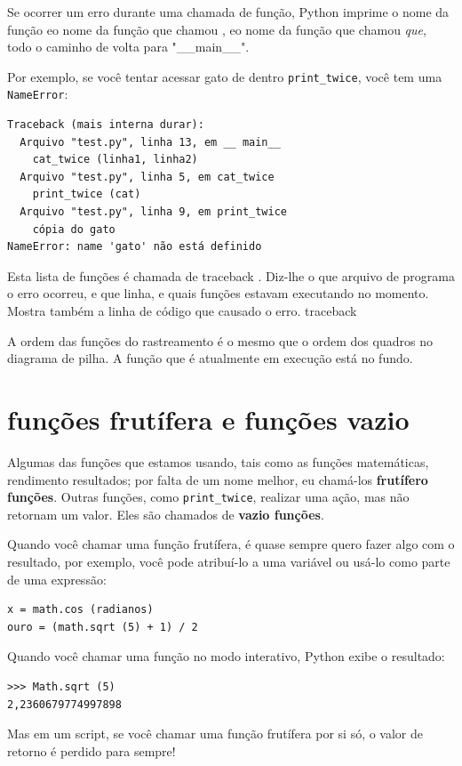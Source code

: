 \documentclass[10pt]{book}
\begin{document}
Se ocorrer um erro durante uma chamada de função, Python imprime o
nome da função eo nome da função que chamou
, eo nome da função que chamou {\em que}, todo o
caminho de volta para \verbo "__main__".

Por exemplo, se você tentar acessar {\tt} gato de dentro 
\Verb "print_twice", você tem uma {\tt NameError}:

\begin{verbatim}
Traceback (mais interna durar):
  Arquivo "test.py", linha 13, em __ main__
    cat_twice (linha1, linha2)
  Arquivo "test.py", linha 5, em cat_twice
    print_twice (cat)
  Arquivo "test.py", linha 9, em print_twice
    cópia do gato
NameError: name 'gato' não está definido
\end{verbatim}
%
Esta lista de funções é chamada de traceback {\bf}. Diz-lhe o que
arquivo de programa o erro ocorreu, e que linha, e quais funções
estavam executando no momento. Mostra também a linha de código que
causado o erro.
\index{} traceback

A ordem das funções do rastreamento é o mesmo que o
ordem dos quadros no diagrama de pilha. A função que é
atualmente em execução está no fundo.


\section{funções frutífera e funções vazio}

Algumas das funções que estamos usando, tais como as funções matemáticas, rendimento
resultados; por falta de um nome melhor, eu chamá-los {\bf frutífero
  funções}. Outras funções, como \verb "print_twice", realizar uma
ação, mas não retornam um valor. Eles são chamados de {\bf vazio
  funções}.

Quando você chamar uma função frutífera, é quase sempre
quero fazer algo com o resultado, por exemplo, você pode
atribuí-lo a uma variável ou usá-lo como parte de uma expressão:

\begin{verbatim}
x = math.cos (radianos)
ouro = (math.sqrt (5) + 1) / 2
\end{verbatim}
%
Quando você chamar uma função no modo interativo, Python exibe
o resultado:

\begin{verbatim}
>>> Math.sqrt (5)
2,2360679774997898
\end{verbatim}
%
Mas em um script, se você chamar uma função frutífera por si só,
o valor de retorno é perdido para sempre!
\end{document}

